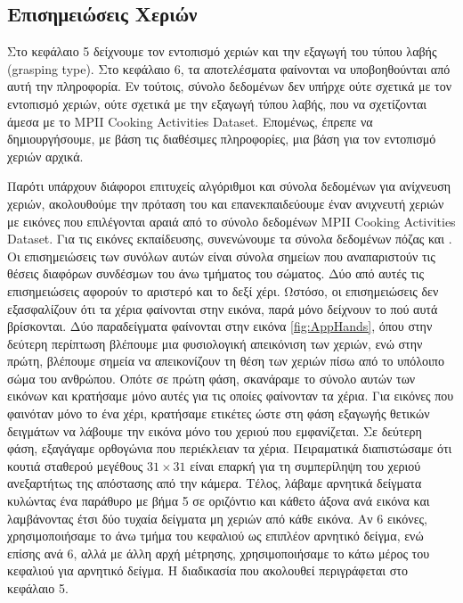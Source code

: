 \subsection{Επισημειώσεις Χεριών}
Στο κεφάλαιο 5 δείχνουμε τον εντοπισμό χεριών και την εξαγωγή του τύπου λαβής (grasping type). Στο κεφάλαιο 6, τα αποτελέσματα φαίνονται να υποβοηθούνται από αυτή την πληροφορία. Εν τούτοις, σύνολο δεδομένων δεν υπήρχε ούτε σχετικά με τον εντοπισμό χεριών, ούτε σχετικά με την εξαγωγή τύπου λαβής, που να σχετίζονται άμεσα με το MPII Cooking Activities Dataset. Επομένως, έπρεπε να δημιουργήσουμε, με βάση τις διαθέσιμες πληροφορίες, μια βάση για τον εντοπισμό χεριών αρχικά.

\par Παρότι υπάρχουν διάφοροι επιτυχείς αλγόριθμοι και σύνολα δεδομένων \cite{mittal_2011} για ανίχνευση χεριών, ακολουθούμε την πρόταση του \cite{rohrbach_2015} και επανεκπαιδεύουμε έναν ανιχνευτή χεριών με εικόνες που επιλέγονται αραιά από το σύνολο δεδομένων MPII Cooking Activities Dataset. Για τις εικόνες εκπαίδευσης, συνενώνουμε τα σύνολα δεδομένων πόζας \cite{amin_2013} και \cite{rohrbach_2012}. Οι επισημειώσεις των συνόλων αυτών είναι σύνολα σημείων που αναπαριστούν τις θέσεις διαφόρων συνδέσμων του άνω τμήματος του σώματος. Δύο από αυτές τις επισημειώσεις αφορούν το αριστερό και το δεξί χέρι. Ωστόσο, οι επισημειώσεις δεν εξασφαλίζουν ότι τα χέρια φαίνονται στην εικόνα, παρά μόνο δείχνουν το πού αυτά βρίσκονται. Δύο παραδείγματα φαίνονται στην εικόνα \ref{fig:AppHands}, όπου στην δεύτερη περίπτωση βλέπουμε μια φυσιολογική απεικόνιση των χεριών, ενώ στην πρώτη, βλέπουμε σημεία να απεικονίζουν τη θέση των χεριών πίσω από το υπόλοιπο σώμα του ανθρώπου. Οπότε σε πρώτη φάση, σκανάραμε το σύνολο αυτών των εικόνων και κρατήσαμε μόνο αυτές για τις οποίες φαίνονταν τα χέρια. Για εικόνες που φαινόταν μόνο το ένα χέρι, κρατήσαμε ετικέτες ώστε στη φάση εξαγωγής θετικών δειγμάτων να λάβουμε την εικόνα μόνο του χεριού που εμφανίζεται. Σε δεύτερη φάση, εξαγάγαμε ορθογώνια που περιέκλειαν τα χέρια. Πειραματικά διαπιστώσαμε ότι κουτιά σταθερού μεγέθους $31 \times 31$ είναι επαρκή για τη συμπερίληψη του χεριού ανεξαρτήτως της απόστασης από την κάμερα. Τέλος, λάβαμε αρνητικά δείγματα κυλώντας ένα παράθυρο με βήμα 5 σε οριζόντιο και κάθετο άξονα ανά εικόνα και λαμβάνοντας έτσι δύο τυχαία δείγματα μη χεριών από κάθε εικόνα. Αν 6 εικόνες, χρησιμοποιήσαμε το άνω τμήμα του κεφαλιού ως επιπλέον αρνητικό δείγμα, ενώ επίσης ανά 6, αλλά με άλλη αρχή μέτρησης, χρησιμοποιήσαμε το κάτω μέρος του κεφαλιού για αρνητικό δείγμα. Η διαδικασία που ακολουθεί περιγράφεται στο κεφάλαιο 5.

